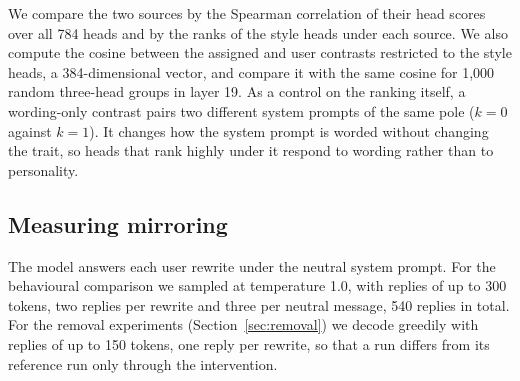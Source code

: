 We compare the two sources by the Spearman correlation of their head scores over all 784 heads and by the ranks of the style heads under each source. We also compute the cosine between the assigned and user contrasts restricted to the style heads, a 384-dimensional vector, and compare it with the same cosine for 1,000 random three-head groups in layer 19. As a control on the ranking itself, a wording-only contrast pairs two different system prompts of the same pole ($k=0$ against $k=1$). It changes how the system prompt is worded without changing the trait, so heads that rank highly under it respond to wording rather than to personality.

\subsection{Measuring mirroring}
\label{sec:mirroring}
The model answers each user rewrite under the neutral system prompt. For the behavioural comparison we sampled at temperature 1.0, with replies of up to 300 tokens, two replies per rewrite and three per neutral message, 540 replies in total. For the removal experiments (Section~\ref{sec:removal}) we decode greedily with replies of up to 150 tokens, one reply per rewrite, so that a run differs from its reference run only through the intervention.

